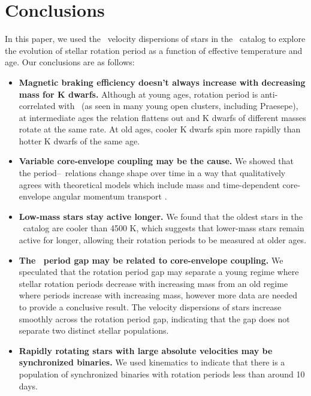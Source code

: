 \section{Conclusions}

In this paper, we used the \vb\ velocity dispersions of stars in the \mct\
catalog to explore the evolution of stellar rotation period as a function of
effective temperature and age.
Our conclusions are as follows:
\begin{itemize}
\item{{\bf Magnetic braking efficiency doesn't always increase with decreasing
mass for K dwarfs.}
Although at young ages, rotation period is anti-correlated with \teff\ (as
seen in many young open clusters, including Praesepe), at intermediate ages the
relation flattens out and K dwarfs of different masses rotate at the same
rate.
At old ages, cooler K dwarfs spin more rapidly than hotter K dwarfs of the
same age.}

\item{{\bf Variable core-envelope coupling may be the cause.} We showed that
the period--\teff\ relations change shape over time in a way that
qualitatively agrees with theoretical models which include mass and
time-dependent core-envelope angular momentum transport \citep{spada2019}.}

\item{{\bf Low-mass stars stay active longer.}
We found that the oldest stars in the \mct\ catalog are cooler than 4500
K, which suggests that lower-mass stars remain active for longer, allowing
their rotation periods to be measured at older ages.}

\item{{\bf The \kepler\ period gap may be related to core-envelope coupling.}
We speculated that the rotation period gap \citep{mcquillan2014} may separate
a young regime where stellar rotation periods decrease with increasing mass
from an old regime where periods increase with increasing mass, however more
data are needed to provide a conclusive result.
The velocity dispersions of stars increase smoothly across the rotation period
gap, indicating that the gap does not separate two distinct stellar
populations.}

\item{{\bf Rapidly rotating stars with large absolute velocities may be
synchronized binaries.}
We used kinematics to indicate that there is a population of
synchronized binaries with rotation periods less than around 10 days.}


\end{itemize}
